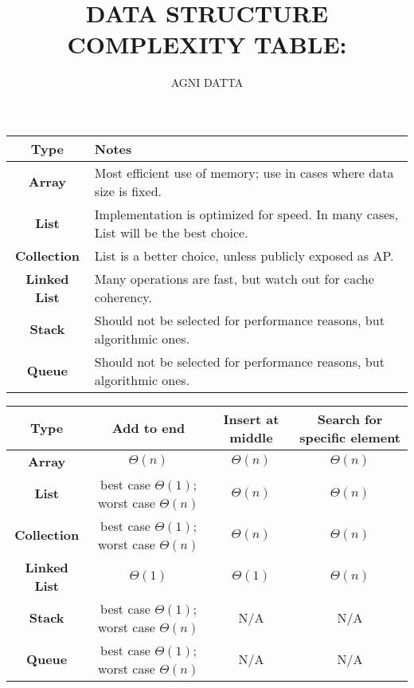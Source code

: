 \documentclass[12pt,american]{article}
\providecommand{\tabularnewline}{\\}
\providecommand{\tabularnewline}{\\}
\begin{document}
\title{\textbf{DATA STRUCTURE COMPLEXITY TABLE:}}
\author{AGNI DATTA}

\maketitle
\vfill{}

\begin{center}
	\begin{tabular}{|c|l|}
		\hline
		\textbf{\small{}Type}        & \textbf{\small{}Notes}\tabularnewline
		\hline
		\hline
		\textbf{\small{}Array}       & {\small{}Most efficient use of memory; use in cases where data size
				is fixed.}\tabularnewline
		\hline
		\textbf{\small{}List}        & {\small{}Implementation is optimized for speed. In many cases, List
				will be the best choice.}\tabularnewline
		\hline
		\textbf{\small{}Collection}  & {\small{}List is a better choice, unless publicly exposed as AP.}\tabularnewline
		\hline
		\textbf{\small{}Linked List} & {\small{}Many operations are fast, but watch out for cache coherency.}\tabularnewline
		\hline
		\textbf{\small{}Stack}       & {\small{}Should not be selected for performance reasons, but algorithmic
				ones.}\tabularnewline
		\hline
		\textbf{\small{}Queue}       & {\small{}Should not be selected for performance reasons, but algorithmic
				ones.}\tabularnewline
		\hline
	\end{tabular}
	\par\end{center}

\begin{center}
	{\small{}\smallskip{}
	}{\small\par}
	\par\end{center}

\begin{center}
	\begin{tabular}{|c|c|c|c|}
		\hline
		\textbf{\small{}Type}        & \textbf{\small{}Add to end}                             & \textbf{\small{}Insert at middle} & \textbf{\small{}Search for specific element}\tabularnewline
		\hline
		\hline
		\textbf{\small{}Array}       & {\small{}$\Theta(n)$}                                   & {\small{}$\Theta(n)$}             & {\small{}$\Theta(n)$}\tabularnewline
		\hline
		\textbf{\small{}List}        & {\small{}best case $\Theta(1)$; worst case $\Theta(n)$} & {\small{}$\Theta(n)$}             & {\small{}$\Theta(n)$}\tabularnewline
		\hline
		\textbf{\small{}Collection}  & {\small{}best case $\Theta(1)$; worst case $\Theta(n)$} & {\small{}$\Theta(n)$}             & {\small{}$\Theta(n)$}\tabularnewline
		\hline
		\textbf{\small{}Linked List} & {\small{}$\Theta(1)$}                                   & {\small{}$\Theta(1)$}             & {\small{}$\Theta(n)$}\tabularnewline
		\hline
		\textbf{\small{}Stack}       & {\small{}best case $\Theta(1)$; worst case $\Theta(n)$} & {\small{}N/A}                     & {\small{}N/A}\tabularnewline
		\hline
		\textbf{\small{}Queue}       & {\small{}best case $\Theta(1)$; worst case $\Theta(n)$} & {\small{}N/A}                     & {\small{}N/A}\tabularnewline
		\hline
	\end{tabular}
	\par\end{center}
\end{document}
